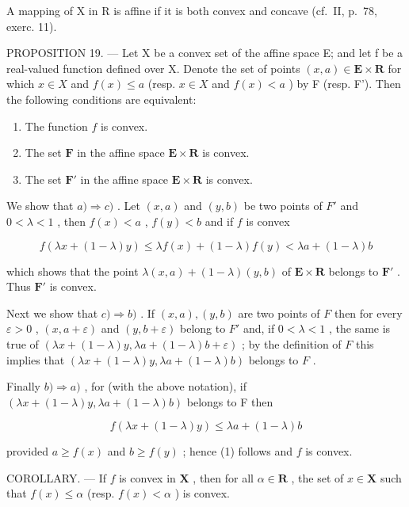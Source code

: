A mapping of X in R is affine if it is both convex and concave (cf.~II, p.~78, exerc. 11).

PROPOSITION 19. --- Let X be a convex set of the affine space E; and let f be a real-valued function defined over X. Denote the set of points \((x, a) \in \mathbf{E} \times \mathbf{R}\) for which \(x \in X\) and \(f(x) \leqslant a\) (resp. \(x \in X\) and \(f(x) < a\) ) by F (resp. F'). Then the following conditions are equivalent:

\begin{enumerate}
\def\labelenumi{\alph{enumi})}
\item
  The function \(f\) is convex.
\item
  The set \(\mathbf{F}\) in the affine space \(\mathbf{E} \times \mathbf{R}\) is convex.
\item
  The set \(\mathbf{F}'\) in the affine space \(\mathbf{E} \times \mathbf{R}\) is convex.
\end{enumerate}

We show that \(a) \Rightarrow c)\) . Let \((x, a)\) and \((y, b)\) be two points of \(F'\) and \(0 < \lambda < 1\) , then \(f(x) < a\) , \(f(y) < b\) and if \(f\) is convex

\[
f (\lambda x + (1 - \lambda) y) \leqslant \lambda f (x) + (1 - \lambda) f (y) <   \lambda a + (1 - \lambda) b
\]

which shows that the point \(\lambda(x, a) + (1 - \lambda)(y, b)\) of \(\mathbf{E} \times \mathbf{R}\) belongs to \(\mathbf{F}'\) . Thus \(\mathbf{F}'\) is convex.

Next we show that \(c) \Rightarrow b)\) . If \((x, a), (y, b)\) are two points of \(F\) then for every \(\varepsilon > 0\) , \((x, a + \varepsilon)\) and \((y, b + \varepsilon)\) belong to \(F'\) and, if \(0 < \lambda < 1\) , the same is true of \((\lambda x + (1 - \lambda)y, \lambda a + (1 - \lambda)b + \varepsilon)\) ; by the definition of \(F\) this implies that \((\lambda x + (1 - \lambda)y, \lambda a + (1 - \lambda)b)\) belongs to \(F\) .

Finally \(b) \Rightarrow a)\) , for (with the above notation), if \((\lambda x + (1 - \lambda)y, \lambda a + (1 - \lambda)b)\) belongs to F then

\[
f (\lambda x + (1 - \lambda) y) \leqslant \lambda a + (1 - \lambda) b
\]

provided \(a \geqslant f(x)\) and \(b \geqslant f(y)\) ; hence (1) follows and \(f\) is convex.

COROLLARY. --- If \(f\) is convex in \(\mathbf{X}\) , then for all \(\alpha \in \mathbf{R}\) , the set of \(x \in \mathbf{X}\) such that \(f(x) \leqslant \alpha\) (resp. \(f(x) < \alpha\) ) is convex.

